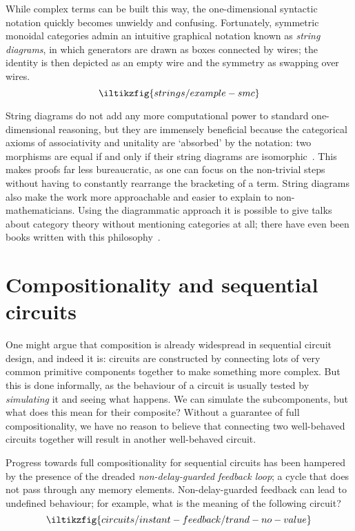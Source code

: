 While complex terms can be built this way, the one-dimensional
syntactic notation quickly becomes unwieldy and confusing.
Fortunately, symmetric monoidal categories admin an intuitive graphical notation
known as \emph{string diagrams}, in which generators are drawn as boxes connected
by wires; the identity is then depicted as an empty wire and the symmetry as
swapping over wires.
\[
    \iltikzfig{strings/example-smc}
\]

String diagrams do not add any more computational power to
standard one-dimensional reasoning, but they are
immensely beneficial because the categorical axioms of associativity and
unitality are `absorbed' by the notation: two morphisms are equal if and only if
their string diagrams are isomorphic~\cite{kelly1980coherence,kissinger2014abstract}.
This makes proofs far less bureaucratic, as one can focus on the non-trivial
steps without having to constantly rearrange the bracketing of a term.
String diagrams also make the work more approachable and easier to explain to
non-mathematicians.
Using the diagrammatic approach it is possible to give talks about category
theory without mentioning categories at all; there have even been books written
with this philosophy~\cite{coecke2018picturing}.


\section{Compositionality and sequential circuits}

One might argue that composition is already widespread in sequential circuit
design, and indeed it is: circuits are constructed by connecting lots of very
common primitive components together to make something more complex.
But this is done informally, as the behaviour of a circuit is usually tested
by \emph{simulating} it and seeing what happens.
We can simulate the subcomponents, but what does this mean for their composite?
Without a guarantee of full compositionality, we have no reason to
believe that connecting two well-behaved circuits together will result in
another well-behaved circuit.

Progress towards full compositionality for sequential circuits has been hampered
by the presence of the dreaded \emph{non-delay-guarded feedback loop}; a cycle
that does not pass through any memory elements.
Non-delay-guarded feedback can lead to undefined behaviour; for example, what is
the meaning of the following circuit?
\[
    \iltikzfig{circuits/instant-feedback/trand-no-value}
\]

